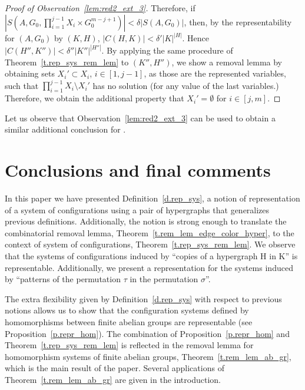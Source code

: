 \documentclass[10pt]{article}
\begin{document}
\begin{proof}[Proof of Observation~\ref{lem:red2_ext_3}]
Therefore, if $|S(A,G_0,\prod_{i=1}^{j-1} X_i\times G_0^{m-j+1})|<\delta |S(A,G_0)|$, then, by the representability for $(A,G_0)$ by $(K,H)$, $|C(H,K)|<\delta' |K|^{|H|}$. Hence $|C(H'',K'')|<\delta'' |K''|^{|H''|}$.
By applying the same procedure of Theorem~\ref{t.rep_sys_rem_lem} to $(K'',H'')$, we show a removal lemma by obtaining sets $X_i'\subset X_i$, $i\in[1,j-1]$, as those are the represented variables, such that $\prod_{i=1}^{j-1} X_i\setminus X_i'$ has no solution (for any value of the last variables.) Therefore, we obtain the additional property that $X_i'=\emptyset$ for  $i\in [j,m]$.
\end{proof}

Let us observe that Observation~\ref{lem:red2_ext_3} can be used to obtain a similar additional conclusion for \cite[Theorem~1]{ksv13}.


\section{Conclusions and final comments}



In this paper we have presented Definition~\ref{d.rep_sys}, a notion of representation of a system of configurations using a pair of hypergraphs that generalizes previous definitions. Additionally, the notion is strong enough to translate the combinatorial removal lemma, Theorem~\ref{t.rem_lem_edge_color_hyper}, to the context of system of configurations, Theorem~\ref{t.rep_sys_rem_lem}. We observe that the systems of configurations induced by ``copies of a hypergraph H in K'' is representable. Additionally, we present a representation for the systems induced by ``patterns of the permutation $\tau$ in the permutation $\sigma$''.

The extra flexibility given by Definition~\ref{d.rep_sys} with respect to previous notions allows us to show that the configuration systems defined by homomorphisms between finite abelian groups are representable (see Proposition~\ref{p.repr_hom}). The combination of Proposition~\ref{p.repr_hom} and Theorem~\ref{t.rep_sys_rem_lem} is reflected in the removal lemma for homomorphism systems of finite abelian groups, Theorem~\ref{t.rem_lem_ab_gr}, which is the main result of the paper. Several applications of Theorem~\ref{t.rem_lem_ab_gr} are given in the introduction.
\end{document}
